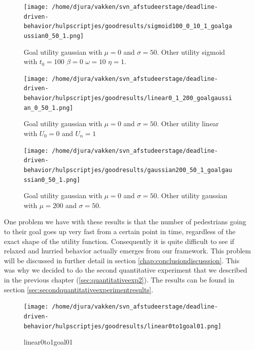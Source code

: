\documentclass[11pt]{book}
\begin{document}
\begin{figure}[h]
\centering
\texttt{[image: /home/djura/vakken/svn\_afstudeerstage/deadline-driven-behavior/hulpscriptjes/goodresults/sigmoid100\_0\_10\_1\_goalgaussian0\_50\_1.png]}
\caption{Goal utility gaussian with $\mu=0$ and $\sigma=50$. Other utility sigmoid with $t_0=100$ $\beta=0$ $\omega=10$ $\eta=1$.}
\label{fig:sigmoid100_0_10_1_goalgaussian0_50_1}
\end{figure}

\begin{figure}[h]
\centering
\texttt{[image: /home/djura/vakken/svn\_afstudeerstage/deadline-driven-behavior/hulpscriptjes/goodresults/linear0\_1\_200\_goalgaussian\_0\_50\_1.png]}
\caption{Goal utility gaussian with $\mu=0$ and $\sigma=50$. Other utility linear with $U_0=0$ and $U_n=1$}
\label{fig:linear0_1_200_goalgaussian_0_50_1}
\end{figure}

\begin{figure}[h]
\centering
\texttt{[image: /home/djura/vakken/svn\_afstudeerstage/deadline-driven-behavior/hulpscriptjes/goodresults/gaussian200\_50\_1\_goalgaussian0\_50\_1.png]}
\caption{Goal utility gaussian with $\mu=0$ and $\sigma=50$. Other utility gaussian with $\mu=200$ and $\sigma=50$.}
\label{fig:gaussian200_50_1_goalgaussian0_50_1}
\end{figure}

One problem we have with these results is that the number of pedestrians going to their goal goes up very fast from a certain point in time, regardless of the exact shape of the utility function. Consequently it is quite difficult to see if relaxed and hurried behavior actually emerges from our framework. This problem will be discussed in further detail in section \ref{chap:conclusiondiscusssion}. This was why we decided to do the second quantitative experiment that we described in the previous chapter (\ref{sec:quantitativeexp2}). The results can be found in section \ref{sec:secondquantitativeexperimentresults}.


\begin{figure}[h]
\centering
\texttt{[image: /home/djura/vakken/svn\_afstudeerstage/deadline-driven-behavior/hulpscriptjes/goodresults/linear0to1goal01.png]}
\caption{linear0to1goal01}
\label{fig:linear0to1goal01}
\end{figure}
\end{document}
